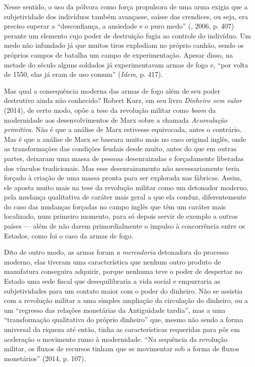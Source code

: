 Nesse sentido, o uso da pólvora como força propulsora de uma arma exigia
que a subjetividade dos indivíduos também avançasse, saísse das
crendices, ou seja, era preciso superar a ``desconfiança, a ansiedade e
o puro medo'' (, 2006, p. 407) perante um elemento cujo poder de
destruição fugia ao controle do indivíduo. Um medo não infundado já que
muitos tiros explodiam no próprio canhão, sendo os próprios campos de
batalha um campo de experimentação. Apesar disso, na metade do século 
alguns soldados já experimentavam armas de fogo e, ``por volta de 1550,
elas já eram de uso comum'' (\emph{Idem}, p. 417).

Mas qual a consequência moderna das armas de fogo além de seu poder
destrutivo ainda não conhecido? Robert Kurz, em seu livro \emph{Dinheiro
sem valor} (2014), de certo modo, opõe a tese da revolução
militar como \emph{boom} da modernidade aos desenvolvimentos de Marx
sobre a chamada \emph{Acumulação primitiva.} Não é que a análise de Marx
estivesse equivocada, antes o contrário. Mas é que a análise de Marx se
baseara muito mais no caso original inglês, onde as transformações das
condições feudais desde muito, antes do que em outras partes, deixaram
uma massa de pessoas desenraizadas e forçadamente liberadas dos vínculos
tradicionais. Mas esse desenraizamento não necessariamente
teria forçado à criação de uma massa pronta para ser explorada nas
fábricas. Assim, ele aposta muito mais na tese da revolução militar como
um detonador moderno, pela mudança qualitativa de caráter mais geral a
que ela conduz, diferentemente do caso das mudanças forçadas no campo
inglês que têm um caráter mais localizado, num primeiro momento, para só
depois servir de exemplo a outros países --- além de não darem
primordialmente o impulso à concorrência entre os Estados, como foi o
caso da armas de fogo.

Dito de outro modo, as armas foram \emph{a mercadoria} detonadora do
processo moderno, elas tiveram uma característica que nenhum outro
produto de manufatura conseguira adquirir, porque nenhuma teve o poder
de despertar no Estado uma sede fiscal que desequilibraria a vida social
e empurraria as subjetividades para um contato maior com o poder do
dinheiro. Não se assistia com a revolução militar a uma
simples ampliação da circulação do dinheiro, ou a um ``regresso das
relações monetárias da Antiguidade tardia'', mas a uma ``transformação
qualitativa do próprio dinheiro'' que, mesmo não sendo a forma universal
da riqueza até então, tinha as características requeridas para pôr em
aceleração o movimento rumo à modernidade. ``Na sequência da revolução
militar, os fluxos de recursos tinham que se movimentar sob a forma de
fluxos monetários'' (2014, p. 107).

